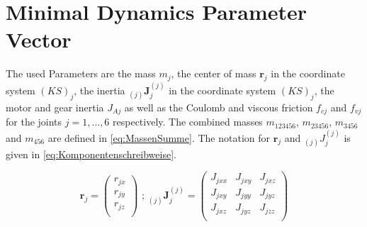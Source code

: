 
\appendices
\label{sec:Appendix}
\section{Minimal Dynamics Parameter Vector}
\label{sec:MinparamVector}

The used Parameters are the mass $m_j$, the center of mass $\boldsymbol{r}_j$ in the coordinate system $(KS)_j$, the inertia $_{(j)}\boldsymbol{J}_j^{(j)}$ in the coordinate system $(KS)_j$, the motor and gear inertia $J_{Aj}$ as well as the Coulomb and viscous friction $f_{cj}$ and $f_{vj}$ for the joints $j=1,\ldots,6$ respectively. 
The combined masses $m_{123456}$, $m_{23456}$, $m_{3456}$ and $m_{456}$ are defined in \eqref{eq:MassenSumme}. The notation for $\boldsymbol{r}_j$ and $_{(j)}J_j^{(j)}$ is given in \eqref{eq:Komponentenschreibweise}.

\begin{equation}
\label{eq:Komponentenschreibweise}
	\boldsymbol{r}_j = 
		\begin{pmatrix}
		r_{jx} \\
		r_{jy} \\
		r_{jz} \\
		\end{pmatrix}
	\text{ ; }
	_{(j)}\boldsymbol{J}_j^{(j)} = 
		\begin{pmatrix}
		J_{jxx} & J_{jxy} & J_{jxz} \\
		J_{jxy} & J_{jyy} & J_{jyz} \\
		J_{jxz} & J_{jyz} & J_{jzz} \\
		\end{pmatrix}
\end{equation}


